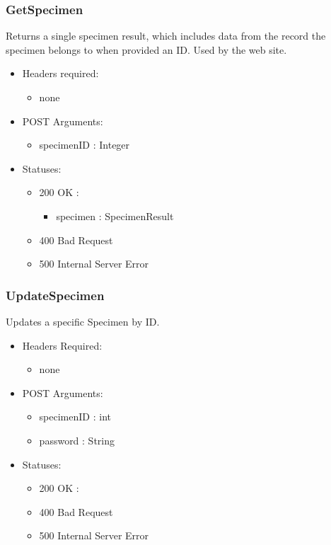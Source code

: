     \subsubsection{GetSpecimen}
        Returns a single specimen result, which includes data from the record the specimen belongs to when provided an ID. Used by the web site.
        \begin{itemize}
            \item Headers required: 
            \begin{itemize}
                \item none
            \end{itemize}
            \item POST Arguments:
            \begin{itemize}
                \item specimenID : Integer
            \end{itemize}
            \item Statuses:
            \begin{itemize}
                \item 200 OK :
                \begin{itemize}
                    \item specimen : SpecimenResult
                \end{itemize}
                \item 400 Bad Request
                \item 500 Internal Server Error
            \end{itemize}
        \end{itemize}


    \subsubsection{UpdateSpecimen}
        Updates a specific Specimen by ID.
        \begin{itemize}
            \item Headers Required:
            \begin{itemize}
                \item none
            \end{itemize}
            \item POST Arguments:
            \begin{itemize}
                \item specimenID : int
                \item password : String
            \end{itemize}
            \item Statuses: 
            \begin{itemize}
                \item 200 OK :
                \item 400 Bad Request
                \item 500 Internal Server Error
            \end{itemize}
        \end{itemize}

